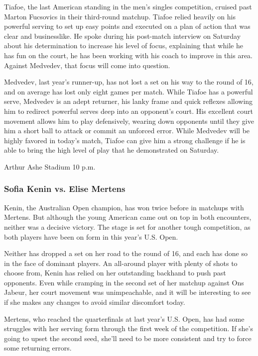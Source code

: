 Tiafoe, the last American standing in the men's singles competition,
cruised past Marton Fucsovics in their third-round matchup. Tiafoe
relied heavily on his powerful serving to set up easy points and
executed on a plan of action that was clear and businesslike. He spoke
during his post-match interview on Saturday about his determination to
increase his level of focus, explaining that while he has fun on the
court, he has been working with his coach to improve in this area.
Against Medvedev, that focus will come into question.

Medvedev, last year's runner-up, has not lost a set on his way to the
round of 16, and on average has lost only eight games per match. While
Tiafoe has a powerful serve, Medvedev is an adept returner, his lanky
frame and quick reflexes allowing him to redirect powerful serves deep
into an opponent's court. His excellent court movement allows him to
play defensively, wearing down opponents until they give him a short
ball to attack or commit an unforced error. While Medvedev will be
highly favored in today's match, Tiafoe can give him a strong challenge
if he is able to bring the high level of play that he demonstrated on
Saturday.

Arthur Ashe Stadium \textbar{} 10 p.m.

\hypertarget{sofia-kenin-vs-elise-mertens}{%
\subsubsection{\texorpdfstring{\textbf{Sofia Kenin vs. Elise
Mertens}}{Sofia Kenin vs. Elise Mertens}}\label{sofia-kenin-vs-elise-mertens}}

Kenin, the Australian Open champion, has won twice before in matchups
with Mertens. But although the young American came out on top in both
encounters, neither was a decisive victory. The stage is set for another
tough competition, as both players have been on form in this year's U.S.
Open.

Neither has dropped a set on her road to the round of 16, and each has
done so in the face of dominant players. An all-around player with
plenty of shots to choose from, Kenin has relied on her outstanding
backhand to push past opponents. Even while cramping in the second set
of her matchup against Ons Jabeur, her court movement was unimpeachable,
and it will be interesting to see if she makes any changes to avoid
similar discomfort today.

Mertens, who reached the quarterfinals at last year's U.S. Open, has had
some struggles with her serving form through the first week of the
competition. If she's going to upset the second seed, she'll need to be
more consistent and try to force some returning errors.

